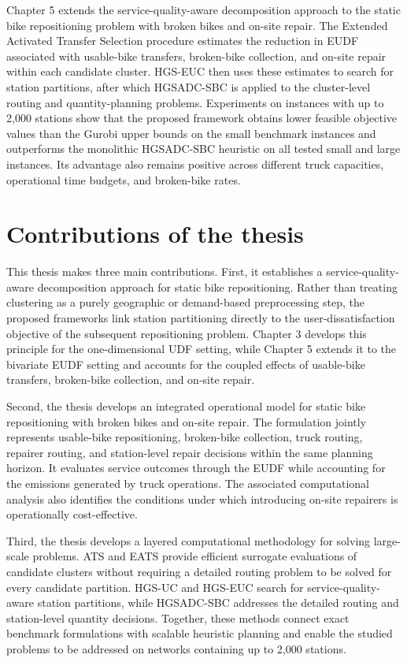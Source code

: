 Chapter 5 extends the service-quality-aware decomposition approach to the static bike repositioning problem with broken bikes and on-site repair. The Extended Activated Transfer Selection procedure estimates the reduction in EUDF associated with usable-bike transfers, broken-bike collection, and on-site repair within each candidate cluster. HGS-EUC then uses these estimates to search for station partitions, after which HGSADC-SBC is applied to the cluster-level routing and quantity-planning problems. Experiments on instances with up to 2,000 stations show that the proposed framework obtains lower feasible objective values than the Gurobi upper bounds on the small benchmark instances and outperforms the monolithic HGSADC-SBC heuristic on all tested small and large instances. Its advantage also remains positive across different truck capacities, operational time budgets, and broken-bike rates.

\section{Contributions of the thesis}

This thesis makes three main contributions. First, it establishes a service-quality-aware decomposition approach for static bike repositioning. Rather than treating clustering as a purely geographic or demand-based preprocessing step, the proposed frameworks link station partitioning directly to the user-dissatisfaction objective of the subsequent repositioning problem. Chapter 3 develops this principle for the one-dimensional UDF setting, while Chapter 5 extends it to the bivariate EUDF setting and accounts for the coupled effects of usable-bike transfers, broken-bike collection, and on-site repair.

Second, the thesis develops an integrated operational model for static bike repositioning with broken bikes and on-site repair. The formulation jointly represents usable-bike repositioning, broken-bike collection, truck routing, repairer routing, and station-level repair decisions within the same planning horizon. It evaluates service outcomes through the EUDF while accounting for the emissions generated by truck operations. The associated computational analysis also identifies the conditions under which introducing on-site repairers is operationally cost-effective.

Third, the thesis develops a layered computational methodology for solving large-scale problems. ATS and EATS provide efficient surrogate evaluations of candidate clusters without requiring a detailed routing problem to be solved for every candidate partition. HGS-UC and HGS-EUC search for service-quality-aware station partitions, while HGSADC-SBC addresses the detailed routing and station-level quantity decisions. Together, these methods connect exact benchmark formulations with scalable heuristic planning and enable the studied problems to be addressed on networks containing up to 2,000 stations.

